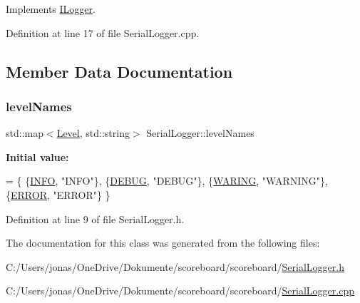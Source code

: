 Implements \hyperlink{class_i_logger_ad7ebc4b8b6a509f4c3b973343c5fc1f1}{I\+Logger}.



Definition at line 17 of file Serial\+Logger.\+cpp.



\subsection{Member Data Documentation}
\mbox{\label{class_serial_logger_a77aa170b33c8f7ae9726cc2b1275e7cb}} 
\subsubsection{\texorpdfstring{level\+Names}{levelNames}}
{\footnotesize\ttfamily std\+::map$<$\hyperlink{class_i_logger_af129a40b0950160d0fe6c6b675d9d761}{Level}, std\+::string$>$ Serial\+Logger\+::level\+Names\hspace{0.3cm}{\ttfamily [private]}}

{\bfseries Initial value\+:}
\begin{DoxyCode}
=
    \{
    \{\hyperlink{class_i_logger_af129a40b0950160d0fe6c6b675d9d761a1de9525e76b4d18631d4371fb0e4697c}{INFO}, \textcolor{stringliteral}{"INFO"}\},
    \{\hyperlink{class_i_logger_af129a40b0950160d0fe6c6b675d9d761a8d9f1b016a76655dab45b63a335227af}{DEBUG}, \textcolor{stringliteral}{"DEBUG"}\},
    \{\hyperlink{class_i_logger_af129a40b0950160d0fe6c6b675d9d761ace8c0022cd4dd8851aea339bfcd19e32}{WARING}, \textcolor{stringliteral}{"WARNING"}\},
    \{\hyperlink{class_i_logger_af129a40b0950160d0fe6c6b675d9d761ad8c193b079fed311195eb87f00d088c8}{ERROR}, \textcolor{stringliteral}{"ERROR"}\}
    \}
\end{DoxyCode}


Definition at line 9 of file Serial\+Logger.\+h.



The documentation for this class was generated from the following files\+:\begin{DoxyCompactItemize}
\item 
C\+:/\+Users/jonas/\+One\+Drive/\+Dokumente/scoreboard/scoreboard/\hyperlink{_serial_logger_8h}{Serial\+Logger.\+h}\item 
C\+:/\+Users/jonas/\+One\+Drive/\+Dokumente/scoreboard/scoreboard/\hyperlink{_serial_logger_8cpp}{Serial\+Logger.\+cpp}\end{DoxyCompactItemize}

